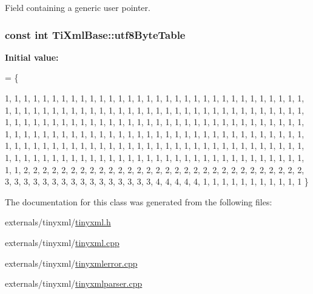 Field containing a generic user pointer. 

\hypertarget{class_ti_xml_base_ac8c86058137bdb4b413c3eca58f2d467}{
\subsubsection[{utf8\-Byte\-Table}]{\setlength{\rightskip}{0pt plus 5cm}const int Ti\-Xml\-Base\-::utf8\-Byte\-Table\hspace{0.3cm}{\ttfamily [static]}}}\label{class_ti_xml_base_ac8c86058137bdb4b413c3eca58f2d467}
{\bfseries Initial value\-:}
\begin{DoxyCode}
= 
\{
    
        1,  1,  1,  1,  1,  1,  1,  1,  1,  1,  1,  1,  1,  1,  1,  1,  
        1,  1,  1,  1,  1,  1,  1,  1,  1,  1,  1,  1,  1,  1,  1,  1,  
        1,  1,  1,  1,  1,  1,  1,  1,  1,  1,  1,  1,  1,  1,  1,  1,  
        1,  1,  1,  1,  1,  1,  1,  1,  1,  1,  1,  1,  1,  1,  1,  1,  
        1,  1,  1,  1,  1,  1,  1,  1,  1,  1,  1,  1,  1,  1,  1,  1,  
        1,  1,  1,  1,  1,  1,  1,  1,  1,  1,  1,  1,  1,  1,  1,  1,  
        1,  1,  1,  1,  1,  1,  1,  1,  1,  1,  1,  1,  1,  1,  1,  1,  
        1,  1,  1,  1,  1,  1,  1,  1,  1,  1,  1,  1,  1,  1,  1,  1,  
        1,  1,  1,  1,  1,  1,  1,  1,  1,  1,  1,  1,  1,  1,  1,  1,  
        1,  1,  1,  1,  1,  1,  1,  1,  1,  1,  1,  1,  1,  1,  1,  1,  
        1,  1,  1,  1,  1,  1,  1,  1,  1,  1,  1,  1,  1,  1,  1,  1,  
        1,  1,  1,  1,  1,  1,  1,  1,  1,  1,  1,  1,  1,  1,  1,  1,  
        1,  1,  2,  2,  2,  2,  2,  2,  2,  2,  2,  2,  2,  2,  2,  2,  
        2,  2,  2,  2,  2,  2,  2,  2,  2,  2,  2,  2,  2,  2,  2,  2,  
        3,  3,  3,  3,  3,  3,  3,  3,  3,  3,  3,  3,  3,  3,  3,  3,  
        4,  4,  4,  4,  4,  1,  1,  1,  1,  1,  1,  1,  1,  1,  1,  1   
\}
\end{DoxyCode}


The documentation for this class was generated from the following files\-:\begin{DoxyCompactItemize}
\item 
externals/tinyxml/\hyperlink{tinyxml_8h}{tinyxml.\-h}\item 
externals/tinyxml/\hyperlink{tinyxml_8cpp}{tinyxml.\-cpp}\item 
externals/tinyxml/\hyperlink{tinyxmlerror_8cpp}{tinyxmlerror.\-cpp}\item 
externals/tinyxml/\hyperlink{tinyxmlparser_8cpp}{tinyxmlparser.\-cpp}\end{DoxyCompactItemize}
